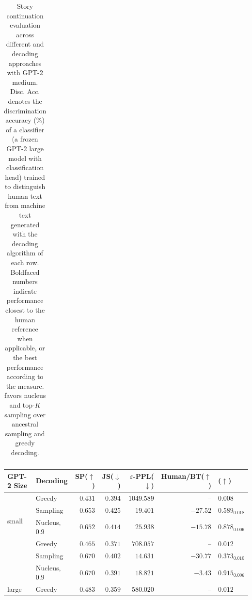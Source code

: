 \documentclass{article}
\theoremstyle{definition}
\renewcommand \epsilon \varepsilon
\newcommand{\name}{{\fontfamily{bch}\selectfont{\textsc{Mauve}}}\xspace}
\begin{document}
\begin{table}[t!]
\begin{adjustbox}{max width=0.95\textwidth}
\begin{tabular}{llllllll}
\bottomrule
\end{tabular}
 \end{adjustbox}
\caption{Story continuation evaluation across different and decoding approaches with GPT-2 medium.
Disc. Acc. denotes the discrimination accuracy (\%) of a classifier (a frozen GPT-2 large model with classification head) trained to distinguish human text from machine text generated with the decoding algorithm of each row. 
Boldfaced numbers indicate performance closest to the human reference when applicable, or the best performance according to the measure.
\name favors nucleus and top-$K$ sampling over ancestral sampling and greedy decoding.
}
\label{tab:mauve:expt:wp-appendix}
\end{table}

%
\begin{table}[t!]
\centering
\begin{adjustbox}{max width=0.7\textwidth}
\begin{tabular}{llrrrrl}
\toprule
\bf GPT-2  Size    &   \bf    Decoding             &  \bf   SP($\uparrow$) &  \bf JS($\downarrow$) & \bf $\epsilon$-PPL($\downarrow$) & \bf Human/BT($\uparrow$) & \bf \name($\uparrow$) \\
\midrule
\multirow{4}{*}{small} & Greedy &                         $0.431$ &           $0.394$ &                   $1049.589$ &          --            &                    $0.008$ \\
& Sampling &             $0.653$ &           $0.425$ &                     $19.401$ &             $-27.52$ &            $0.589_{0.018}$ \\
      & Nucleus, $0.9$ &         $0.652$ &           $0.414$ &                     $25.938$ &             $-15.78$ &            $0.878_{0.006}$ \\
\midrule
\multirow{4}{*}{medium} & Greedy &                          $0.465$ &           $0.371$ &                    $708.057$ &              --        &                    $0.012$ \\
& Sampling &      $0.670$ &           $0.402$ &                     $14.631$ &             $-30.77$ &            $0.373_{0.010}$ \\
      & Nucleus, $0.9$ &              $0.670$ &           $0.391$ &                     $18.821$ &              $-3.43$ &            $0.915_{0.006}$ \\
\midrule
\multirow{4}{*}{large} & Greedy &                     $0.483$ &           $0.359$ &                    $580.020$ &            --          &                    $0.012$ \\

\end{tabular}
\end{adjustbox}
\end{table}
\end{document}
